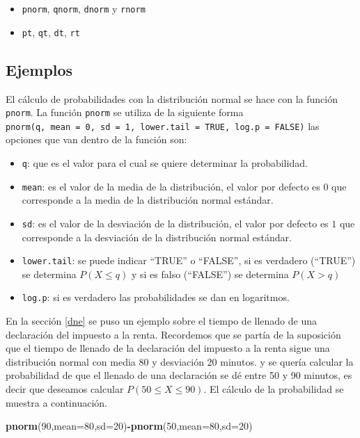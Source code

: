 \documentclass[]{book}
\newenvironment{Shaded}{\begin{snugshade}}{\end{snugshade}}
\newcommand{\DataTypeTok}[1]{\textcolor[rgb]{0.13,0.29,0.53}{#1}}
\newcommand{\DecValTok}[1]{\textcolor[rgb]{0.00,0.00,0.81}{#1}}
\newcommand{\KeywordTok}[1]{\textcolor[rgb]{0.13,0.29,0.53}{\textbf{#1}}}
\newcommand{\NormalTok}[1]{#1}
\newcommand{\OperatorTok}[1]{\textcolor[rgb]{0.81,0.36,0.00}{\textbf{#1}}}
\providecommand{\tightlist}{%
  \setlength{\itemsep}{0pt}\setlength{\parskip}{0pt}}
\begin{document}
\begin{itemize}
\tightlist
\item
  \texttt{pnorm}, \texttt{qnorm}, \texttt{dnorm} y \texttt{rnorm}
\item
  \texttt{pt}, \texttt{qt}, \texttt{dt}, \texttt{rt}
\end{itemize}

\hypertarget{ejemplos}{%
\subsection{Ejemplos}\label{ejemplos}}

El cálculo de probabilidades con la distribución normal se hace con la función \texttt{pnorm}. La función \texttt{pnorm} se utiliza de la siguiente forma \texttt{pnorm(q,\ mean\ =\ 0,\ sd\ =\ 1,\ lower.tail\ =\ TRUE,\ log.p\ =\ FALSE)} las opciones que van dentro de la función son:

\begin{itemize}
\tightlist
\item
  \texttt{q}: que es el valor para el cual se quiere determinar la probabilidad.
\item
  \texttt{mean}: es el valor de la media de la distribución, el valor por defecto es \(0\) que corresponde a la media de la distribución normal estándar.
\item
  \texttt{sd}: es el valor de la desviación de la distribución, el valor por defecto es \(1\) que corresponde a la desviación de la distribución normal estándar.
\item
  \texttt{lower.tail}: se puede indicar ``TRUE'' o ``FALSE'', si es verdadero (``TRUE'') se determina \(P\left(X \leq q \right)\) y si es falso (``FALSE'') se determina \(P\left( X > q \right)\)
\item
  \texttt{log.p}: si es verdadero las probabilidades se dan en logaritmos.
\end{itemize}

En la sección \ref{dne} se puso un ejemplo sobre el tiempo de llenado de una declaración del impuesto a la renta. Recordemos que se partía de la suposición que el tiempo de llenado de la declaración del impuesto a la renta sigue una distribución normal con media \(80\) y desviación \(20\) minutos. y se quería calcular la probabilidad de que el llenado de una declaración se dé entre 50 y 90 minutos, es decir que deseamos calcular \(P\left( 50 \leq X \leq 90 \right)\). El cálculo de la probabilidad se muestra a continuación.

\begin{Shaded}
\begin{Highlighting}[]
\KeywordTok{pnorm}\NormalTok{(}\DecValTok{90}\NormalTok{,}\DataTypeTok{mean=}\DecValTok{80}\NormalTok{,}\DataTypeTok{sd=}\DecValTok{20}\NormalTok{)}\OperatorTok{-}\KeywordTok{pnorm}\NormalTok{(}\DecValTok{50}\NormalTok{,}\DataTypeTok{mean=}\DecValTok{80}\NormalTok{,}\DataTypeTok{sd=}\DecValTok{20}\NormalTok{)}
\end{Highlighting}
\end{Shaded}
\end{document}
